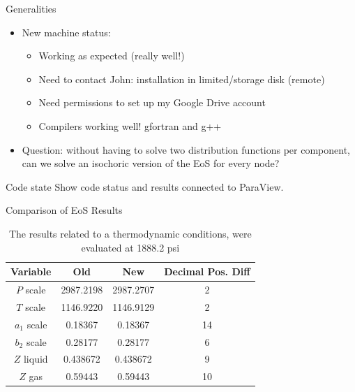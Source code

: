 \documentclass{beamer}
\begin{document}
		\begin{frame}{Generalities}
			\begin{itemize}
				\item<1-> New machine status: 
				\begin{itemize}
					\item Working as expected (really well!)
					\item Need to contact John: installation in limited/storage disk (remote)
					\item Need permissions to set up my Google Drive account
					\item Compilers working well! gfortran and g++
				\end{itemize}
				\item<2-> Question: without having to solve two distribution functions per component, can we solve an isochoric version of the EoS for every node? 
			\end{itemize}
		\end{frame}
		
		\begin{frame}{Code state}
			Show code status and results connected to ParaView.
		\end{frame}
		
		\begin{frame}{Comparison of EoS Results}
			
			
			\begin{table}
				\centering
				\begin{tabular}{cccc}
					Variable & Old & New & Decimal Pos. Diff\\
					\hline
					$P$ scale & 2987.2198 & 2987.2707 & 2\\
					$T$ scale & 1146.9220 & 1146.9129 & 2\\
					$a_1$ scale & 0.18367 & 0.18367 & 14\\
					$b_2$ scale & 0.28177 & 0.28177 & 6\\
					$Z$ liquid & 0.438672 & 0.438672 & 9\\
					$Z$ gas & 0.59443 & 0.59443 & 10					
				\end{tabular}
				\label{table-P1i}
				\caption{The results related to a thermodynamic conditions, were evaluated at 1888.2 psi}
			\end{table}
		\end{frame}
	
		
\end{document}
